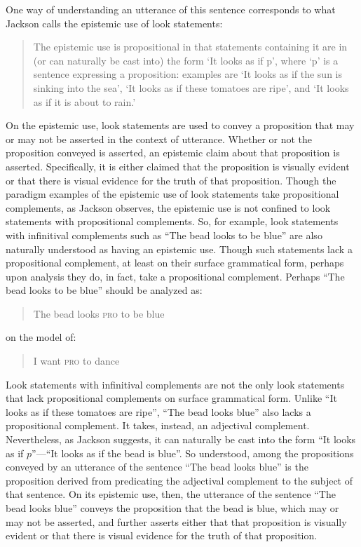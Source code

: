 \documentclass[12pt]{article}
\begin{document}
One way of understanding an utterance of this sentence corresponds to what Jackson calls the epistemic use of look statements:
	\begin{quote}
		The epistemic use is propositional in that statements containing it are in (or can naturally be cast into) the form `It looks as if p', where `p' is a sentence expressing a proposition: examples are `It looks as if the sun is sinking into the sea', `It looks as if these tomatoes are ripe', and `It looks as if it is about to rain.' \citep[30]{Jackson:1977fk}
	\end{quote}
On the epistemic use, look statements are used to convey a proposition that may or may not be asserted in the context of utterance.  Whether or not the proposition conveyed is asserted, an epistemic claim about that proposition is asserted. Specifically, it is either claimed that the proposition is visually evident or that there is visual evidence for the truth of that proposition. Though the paradigm examples of the epistemic use of look statements take propositional complements, as Jackson observes, the epistemic use is not confined to look statements with propositional complements. So, for example, look statements with infinitival complements such as ``The bead looks to be blue'' are also naturally understood as having an epistemic use. Though such statements lack a propositional complement, at least on their surface grammatical form, perhaps upon analysis they do, in fact, take a propositional complement. Perhaps ``The bead looks to be blue'' should be analyzed as:
	\begin{quote}
		The bead looks \textsc{pro} to be blue
	\end{quote}
on the model of:
	\begin{quote}
		I want \textsc{pro} to dance
	\end{quote}
 Look statements with infinitival complements are not the only look statements that lack propositional complements on surface grammatical form. Unlike ``It looks as if these tomatoes are ripe'', ``The bead looks blue'' also lacks a propositional complement. It takes, instead, an adjectival complement. Nevertheless, as Jackson suggests, it can naturally be cast into the form ``It looks as if \( p \)''---``It looks as if the bead is blue''. So understood, among the propositions conveyed by an utterance of the sentence ``The bead looks blue'' is the proposition derived from predicating the adjectival complement to the subject of that sentence. On its epistemic use, then, the utterance of the sentence ``The bead looks blue'' conveys the proposition that the bead is blue, which may or may not be asserted, and further asserts either that that proposition is visually evident or that there is visual evidence for the truth of that proposition.
\end{document}

